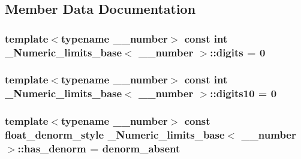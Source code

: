 \subsection{Member Data Documentation}
\hypertarget{class__Numeric__limits__base_add1991ae0dbfd0db80b003cef960add8}{}
\subsubsection[{digits}]{\setlength{\rightskip}{0pt plus 5cm}template$<$typename \+\_\+\+\_\+number$>$ const int {\bf \+\_\+\+Numeric\+\_\+limits\+\_\+base}$<$ \+\_\+\+\_\+number $>$\+::digits = 0\hspace{0.3cm}{\ttfamily [static]}}\label{class__Numeric__limits__base_add1991ae0dbfd0db80b003cef960add8}
\hypertarget{class__Numeric__limits__base_a91ec13f221fb34f8912e120f6ff9d547}{}
\subsubsection[{digits10}]{\setlength{\rightskip}{0pt plus 5cm}template$<$typename \+\_\+\+\_\+number$>$ const int {\bf \+\_\+\+Numeric\+\_\+limits\+\_\+base}$<$ \+\_\+\+\_\+number $>$\+::digits10 = 0\hspace{0.3cm}{\ttfamily [static]}}\label{class__Numeric__limits__base_a91ec13f221fb34f8912e120f6ff9d547}
\hypertarget{class__Numeric__limits__base_a645bb7fcdd0c7fa22e50708a4c1724de}{}
\subsubsection[{has\+\_\+denorm}]{\setlength{\rightskip}{0pt plus 5cm}template$<$typename \+\_\+\+\_\+number$>$ const {\bf float\+\_\+denorm\+\_\+style} {\bf \+\_\+\+Numeric\+\_\+limits\+\_\+base}$<$ \+\_\+\+\_\+number $>$\+::has\+\_\+denorm = {\bf denorm\+\_\+absent}\hspace{0.3cm}{\ttfamily [static]}}\label{class__Numeric__limits__base_a645bb7fcdd0c7fa22e50708a4c1724de}
\hypertarget{class__Numeric__limits__base_a7bdcbb39f7870da9e300fceb0a38cb36}{}
